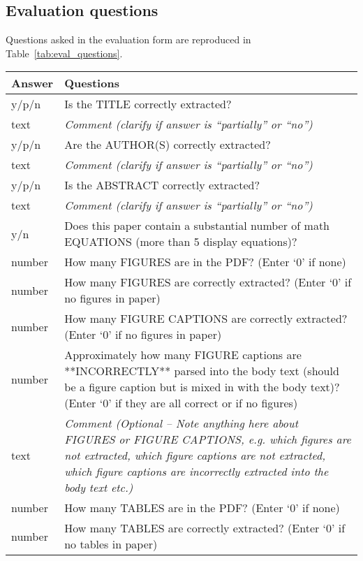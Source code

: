 \subsection{Evaluation questions}

Questions asked in the evaluation form are reproduced in Table~\ref{tab:eval_questions}.

\begin{table}[h!]
\small
\begin{tabular}{lp{130mm}}
    \toprule
    \textbf{Answer} & \textbf{Questions} \\
    \midrule
    y/p/n & Is the TITLE correctly extracted? \\
    text & \textit{Comment (clarify if answer is ``partially'' or ``no'')} \\
    \midrule
    y/p/n & Are the AUTHOR(S) correctly extracted? \\
    text & \textit{Comment (clarify if answer is ``partially'' or ``no'')} \\
    \midrule
    y/p/n & Is the ABSTRACT correctly extracted? \\ 
    text & \textit{Comment (clarify if answer is ``partially'' or ``no'')} \\
    \midrule
    y/n & Does this paper contain a substantial number of math EQUATIONS (more than 5 display equations)? \\
    \midrule
    number & How many FIGURES are in the PDF? (Enter `0' if none) \\
    number & How many FIGURES are correctly extracted? (Enter `0' if no figures in paper) \\
    number & How many FIGURE CAPTIONS are correctly extracted? (Enter `0' if no figures in paper) \\
    number & Approximately how many FIGURE captions are **INCORRECTLY** parsed into the body text (should be a figure caption but is mixed in with the body text)? (Enter `0' if they are all correct or if no figures) \\
    text & \textit{Comment (Optional -- Note anything here about FIGURES or FIGURE CAPTIONS, e.g. which figures are not extracted, which figure captions are not extracted, which figure captions are incorrectly extracted into the body text etc.)} \\
    \midrule
    number & How many TABLES are in the PDF? (Enter `0' if none) \\
    number & How many TABLES are correctly extracted? (Enter `0' if no tables in paper) \\

\end{tabular}
\end{table}
